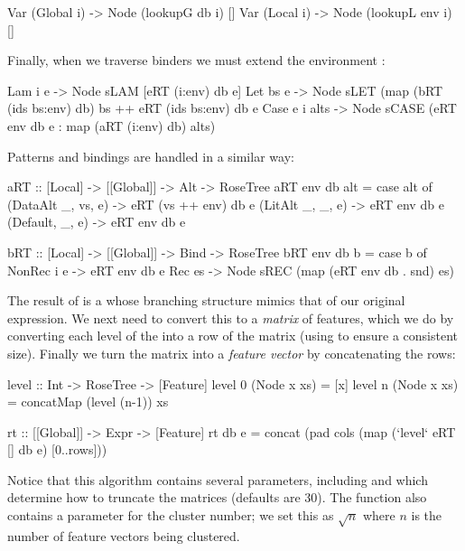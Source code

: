 \begin{haskell}
  Var (Global i) -> Node (lookupG db  i) []
  Var (Local  i) -> Node (lookupL env i) []
\end{haskell}

Finally, when we traverse binders we must extend the environment :

\begin{haskell}
  Lam  i  e     -> Node sLAM [eRT (i:env) db e]
  Let  bs e     -> Node sLET (map (bRT (ids bs:env) db) bs ++
                                   eRT (ids bs:env) db  e
  Case e i alts -> Node sCASE (eRT    env  db  e :
                          map (aRT (i:env) db) alts)
\end{haskell}

Patterns and bindings are handled in a similar way:

\begin{haskell}
aRT :: [Local] -> [[Global]] -> Alt -> RoseTree
aRT env db alt = case alt of
  (DataAlt _, vs, e) -> eRT (vs ++ env) db e
  (LitAlt  _, _,  e) -> eRT env db e
  (Default,   _,  e) -> eRT env db e

bRT :: [Local] -> [[Global]] -> Bind -> RoseTree
bRT env db b = case b of
  NonRec i e -> eRT env db e
  Rec es     -> Node sREC (map (eRT env db . snd) es)
\end{haskell}

The result of  is a  whose branching structure mimics that of our original expression. We next need to convert this to a \emph{matrix} of features, which we do by converting each level of the  into a row of the matrix (using  to ensure a consistent size). Finally we turn the matrix into a \emph{feature vector} by concatenating the rows:

\begin{haskell}
level :: Int -> RoseTree -> [Feature]
level 0 (Node x xs) = [x]
level n (Node x xs) = concatMap (level (n-1)) xs

rt :: [[Global]] -> Expr -> [Feature]
rt db e = concat (pad cols (map (`level` eRT [] db e) [0..rows]))
\end{haskell}

Notice that this algorithm contains several parameters, including  and  which determine how to truncate the matrices (defaults are 30). The  function also contains a parameter for the cluster number; we set this as $\sqrt{n}$ where $n$ is the number of feature vectors being clustered.

